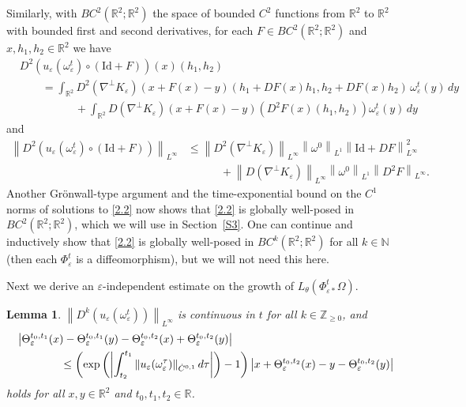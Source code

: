 \documentclass[reqno,centertags,12pt]{amsart}
\newtheorem{lemma}[theorem]{Lemma}
\theoremstyle{definition}
\numberwithin{equation}{section}
\newcommand{\abs}[1]{\left\lvert#1\right\rvert}
\newcommand{\norm}[1]{\left\|#1\right\|}
\newcommand{\lb}{\label}
\newcommand{\bbN}{{\mathbb{N}}}
\newcommand{\bbR}{{\mathbb{R}}}
\newcommand{\bbZ}{{\mathbb{Z}}}
\newcommand{\eps}{\varepsilon}
\newcommand{\tht}{\theta}
\begin{document}
Similarly, with $BC^{2}(\bbR^{2};\bbR^{2})$ the space of
bounded $C^{2}$ functions from $\bbR^{2}$ to $\bbR^{2}$ with bounded first and second derivatives,
for each $F\in BC^{2}(\bbR^{2};\bbR^{2})$ and $x,h_{1},h_{2}\in\bbR^{2}$ we have
\begin{align*}
    &D^{2}(u_{\eps}(\omega_{\eps}^{t})\circ(\mathrm{Id} + F))(x)(h_{1},h_{2})
    \\&\quad\quad = \int_{\bbR^{2}}D^{2}(\nabla^{\perp}K_{\eps})
    (x + F(x) - y)(h_{1} + DF(x)h_{1}, h_{2} + DF(x)h_{2})\,\omega_{\eps}^{t}(y)\,dy
    \\&\quad\quad\quad\quad\quad
    + \int_{\bbR^{2}}D(\nabla^{\perp}K_{\eps})(x + F(x) - y)
    \left(D^{2}F(x)(h_{1}, h_{2})\right)\omega_{\eps}^{t}(y)\,dy
\end{align*}
and
\begin{align*}
    \norm{D^{2}(u_{\eps}(\omega_{\eps}^{t})\circ(\mathrm{Id} + F))}_{L^{\infty}}
    &\leq \norm{D^{2}(\nabla^{\perp}K_{\eps})}_{L^{\infty}} \norm{\omega^{0}}_{L^{1}}
    \norm{\mathrm{Id} + DF}_{L^{\infty}}^{2}
    \\&\quad\quad\quad
    + \norm{D(\nabla^{\perp}K_{\eps})}_{L^{\infty}} \norm{\omega^{0}}_{L^{1}}
    \norm{D^{2}F}_{L^{\infty}}.
\end{align*}
Another Gr\"{o}nwall-type argument and the time-exponential bound on the $C^{1}$ norms of solutions to \eqref{2.2} 
now shows that \eqref{2.2} is globally well-posed in $BC^{2}(\bbR^{2};\bbR^{2})$, which we will use  in Section~\ref{S3}.
One can continue and inductively show that
\eqref{2.2} is globally well-posed in $BC^{k}(\bbR^{2};\bbR^{2})$ for all $k\in\bbN$ (then each $\Phi_{\eps}^{t}$ is a diffeomorphism), but we will not need this here.

Next we derive an $\eps$-independent estimate on the growth of
$L_{\tht}(\Phi_{\eps*}^{t}\Omega)$.

\begin{lemma}\label{L2.5}
    $\norm{D^{k}(u_{\eps}(\omega_{\eps}^{t}))}_{L^{\infty}}$ is continuous in $t$
    for all $k\in\bbZ_{\geq 0}$, and
    \begin{align}
        &\abs{\Theta_{\eps}^{t_{0},t_{1}}(x) - \Theta_{\eps}^{t_{0},t_{1}}(y)
        - \Theta_{\eps}^{t_{0},t_{2}}(x) + \Theta_{\eps}^{t_{0},t_{2}}(y)}  \notag
        \\&\qquad\qquad
        \leq \left(\exp\left(\abs{
            \int_{t_{2}}^{t_{1}}\norm{u_{\eps}(\omega_{\eps}^{\tau})}_{\dot{C}^{0,1}}d\tau
        }\right) - 1\right)
        \abs{x + \Theta_{\eps}^{t_{0},t_{2}}(x) - y - \Theta_{\eps}^{t_{0},t_{2}}(y)}  \lb{2.101}
    \end{align}
    holds for all $x,y\in\bbR^{2}$ and $t_{0},t_{1},t_{2}\in\bbR$.
\end{lemma}
\end{document}
